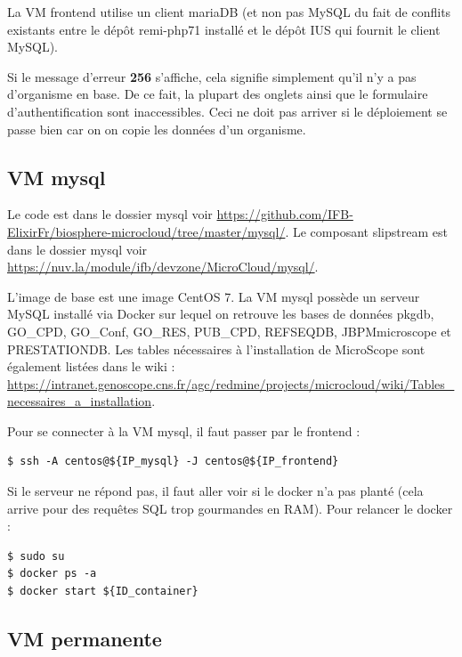 La VM frontend utilise un client mariaDB (et non pas MySQL du fait de conflits existants entre le dépôt remi-php71 installé et le dépôt IUS qui fournit le client MySQL).



\begin{mycolorbox}
    Si le message d’erreur \textbf{256} s’affiche, cela signifie simplement qu’il n’y a pas d’organisme en base.
    De ce fait, la plupart des onglets ainsi que le formulaire d’authentification sont inaccessibles.
    Ceci ne doit pas arriver si le déploiement se passe bien car on on copie les données d'un organisme.
\end{mycolorbox}

\subsection {VM mysql}\label{mysql}

Le code est dans le dossier mysql voir \url{https://github.com/IFB-ElixirFr/biosphere-microcloud/tree/master/mysql/}.
Le composant slipstream est dans le dossier mysql voir \url{https://nuv.la/module/ifb/devzone/MicroCloud/mysql/}.

L'image de base est une image CentOS 7. La VM mysql possède un serveur MySQL installé via Docker sur lequel on retrouve les bases de données pkgdb, GO\_CPD, GO\_Conf, GO\_RES, PUB\_CPD, REFSEQDB, JBPMmicroscope et PRESTATIONDB. Les tables nécessaires à l'installation de MicroScope sont également listées dans le wiki : \url{https://intranet.genoscope.cns.fr/agc/redmine/projects/microcloud/wiki/Tables_necessaires_a_installation}.
\newline

Pour se connecter à la VM mysql, il faut passer par le frontend :
\begin{lstlisting}[style=bash]
$ ssh -A centos@${IP_mysql} -J centos@${IP_frontend}
\end{lstlisting}
\bigskip

Si le serveur ne répond pas, il faut aller voir si le docker n'a pas planté (cela arrive pour des requêtes SQL trop gourmandes en RAM).
Pour relancer le docker :
\begin{lstlisting}[style=bash]
$ sudo su
$ docker ps -a
$ docker start ${ID_container}
\end{lstlisting}

\subsection {VM permanente}\label{VMpermanente}

